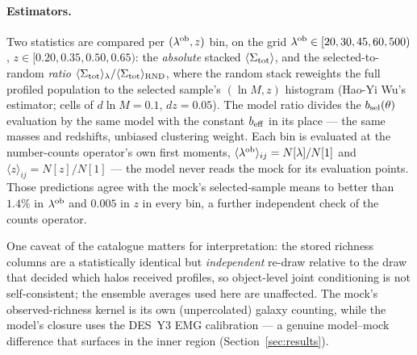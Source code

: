 \paragraph{Estimators.} Two statistics are compared per
$(\lambda^{\rm ob}, z)$ bin, on the grid
$\lambda^{\rm ob} \in [20, 30, 45, 60, 500)$, $z \in [0.20, 0.35, 0.50, 0.65)$:
the \emph{absolute} stacked $\langle\Sigma_{\rm tot}\rangle$, and the
selected-to-random \emph{ratio}
$\langle\Sigma_{\rm tot}\rangle_{\lambda}/\langle\Sigma_{\rm tot}\rangle_{\rm RND}$, where the
random stack reweights the full profiled population to the selected
sample's $(\ln M, z)$ histogram (Hao-Yi Wu's estimator; cells of
$d\ln M = 0.1$, $dz = 0.05$). The model ratio divides the
$b_{\rm sel}(\theta)$ evaluation by the same model with the constant $b_{\rm eff}$
in its place --- the same masses and redshifts, unbiased clustering
weight. Each bin is evaluated at the number-counts operator's own first
moments, $\langle\lambda^{\rm ob}\rangle_{ij} = N[\lambda]/N[1]$ and
$\langle z\rangle_{ij} = N[z]/N[1]$ --- the model never reads the mock
for its evaluation points. Those predictions agree with the mock's
selected-sample means to better than $1.4\%$ in $\lambda^{\rm ob}$ and $0.005$ in
$z$ in every bin, a further independent check of the counts operator.

One caveat of the catalogue matters for interpretation: the stored
richness columns are a statistically identical but \emph{independent}
re-draw relative to the draw that decided which halos received profiles,
so object-level joint conditioning is not self-consistent; the ensemble
averages used here are unaffected. The mock's observed-richness kernel
is its own (unpercolated) galaxy counting, while the model's closure
uses the DES~Y3 EMG calibration --- a genuine model--mock difference
that surfaces in the inner region (Section~\ref{sec:results}).
